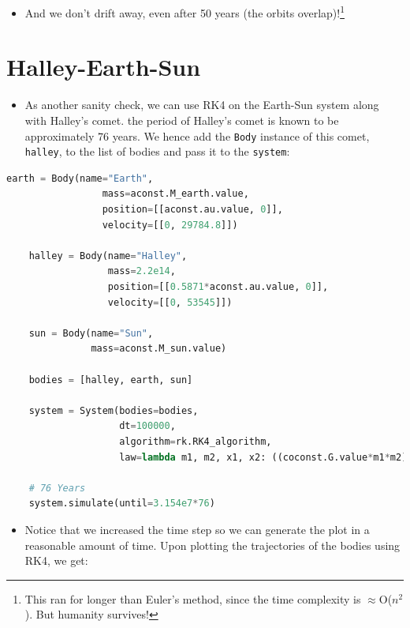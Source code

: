 \documentclass[11pt]{article}
\newcommand{\psubsection}[1]{{\section*{\LARGE #1}}}
\begin{document}
    \begin{itemize}
        \item And we don't drift away, even after 50 years (the orbits overlap)!\footnote{This ran for longer than Euler's method, since the time complexity is $\approx$O($n^2$). But humanity survives!}
    \end{itemize}
    
    \psubsection{Halley-Earth-Sun}
    \begin{itemize}
        \item As another sanity check, we can use RK4 on the Earth-Sun system along with Halley's comet. the period of Halley's comet is known to be approximately 76 years. We hence add the \texttt{Body} instance of this comet, \texttt{halley}, to the list of bodies and pass it to the \texttt{system}:
    \end{itemize}

    \begin{lstlisting}[language=Python, caption=Simulate the system for a year]
    earth = Body(name="Earth",
                 mass=aconst.M_earth.value,
                 position=[[aconst.au.value, 0]],
                 velocity=[[0, 29784.8]])

    halley = Body(name="Halley",
                  mass=2.2e14,
                  position=[[0.5871*aconst.au.value, 0]],
                  velocity=[[0, 53545]])

    sun = Body(name="Sun",
               mass=aconst.M_sun.value)

    bodies = [halley, earth, sun]

    system = System(bodies=bodies,
                    dt=100000,
                    algorithm=rk.RK4_algorithm,
                    law=lambda m1, m2, x1, x2: ((coconst.G.value*m1*m2)/((lin.norm(x2 - x1))**3)) * (x2 - x1))

    # 76 Years
    system.simulate(until=3.154e7*76)
    \end{lstlisting}

    \begin{itemize}
        \item Notice that we increased the time step so we can generate the plot in a reasonable amount of time. Upon plotting the trajectories of the bodies using RK4, we get:
    \end{itemize}
\end{document}
